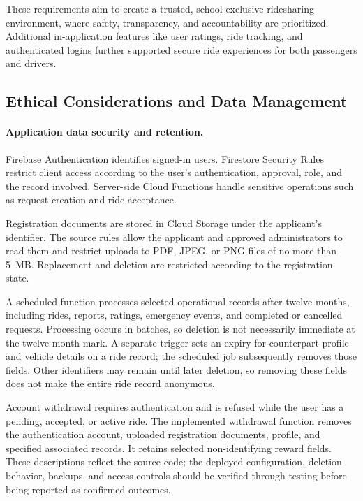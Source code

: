 These requirements aim to create a trusted, school-exclusive ridesharing environment, where safety, transparency, and accountability are prioritized. Additional in-application features like user ratings, ride tracking, and authenticated logins further supported secure ride experiences for both passengers and drivers.

\vspace{1em}
\subsection{Ethical Considerations and Data Management}
\paragraph{Application data security and retention.}
Firebase Authentication identifies signed-in users. Firestore Security Rules restrict client access according to the user’s authentication, approval, role, and the record involved. Server-side Cloud Functions handle sensitive operations such as request creation and ride acceptance.

Registration documents are stored in Cloud Storage under the applicant’s identifier. The source rules allow the applicant and approved administrators to read them and restrict uploads to PDF, JPEG, or PNG files of no more than 5~MB. Replacement and deletion are restricted according to the registration state.

A scheduled function processes selected operational records after twelve months, including rides, reports, ratings, emergency events, and completed or cancelled requests. Processing occurs in batches, so deletion is not necessarily immediate at the twelve-month mark. A separate trigger sets an expiry for counterpart profile and vehicle details on a ride record; the scheduled job subsequently removes those fields. Other identifiers may remain until later deletion, so removing these fields does not make the entire ride record anonymous.

Account withdrawal requires authentication and is refused while the user has a pending, accepted, or active ride. The implemented withdrawal function removes the authentication account, uploaded registration documents, profile, and specified associated records. It retains selected non-identifying reward fields. These descriptions reflect the source code; the deployed configuration, deletion behavior, backups, and access controls should be verified through testing before being reported as confirmed outcomes.

